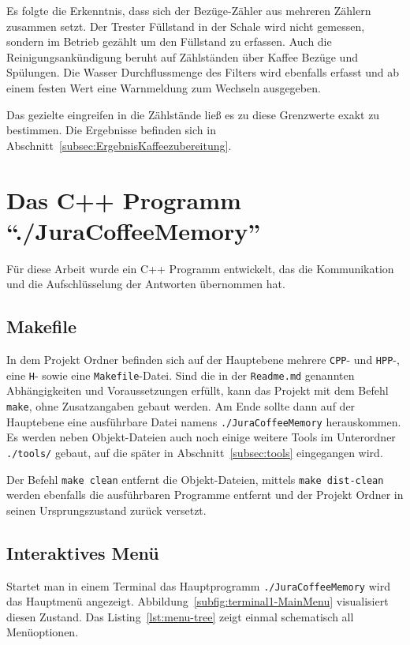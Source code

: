 Es folgte die Erkenntnis, dass sich der Bezüge-Zähler aus mehreren Zählern zusammen setzt.
Der Trester Füllstand in der Schale wird nicht gemessen, sondern im Betrieb gezählt um den Füllstand zu erfassen.
Auch die Reinigungsankündigung beruht auf Zählständen über Kaffee Bezüge und Spülungen.
Die Wasser Durchflussmenge des Filters wird ebenfalls erfasst und ab einem festen Wert eine Warnmeldung zum Wechseln ausgegeben.

Das gezielte eingreifen in die Zählstände ließ es zu diese Grenzwerte exakt zu bestimmen.
Die Ergebnisse befinden sich in Abschnitt~\ref{subsec:ErgebnisKaffeezubereitung}.

\section{Das C++ Programm "`./JuraCoffeeMemory"'}
Für diese Arbeit wurde ein C++ Programm entwickelt, das die Kommunikation und die Aufschlüsselung der Antworten übernommen hat.

\subsection{Makefile}
In dem Projekt Ordner befinden sich auf der Hauptebene mehrere \texttt{CPP}- und \texttt{HPP}-, eine \texttt{H}- sowie eine \texttt{Makefile}-Datei.
Sind die in der \texttt{Readme.md} genannten Abhängigkeiten und Voraussetzungen erfüllt, kann das Projekt mit dem Befehl \texttt{make}, ohne Zusatzangaben gebaut werden.
Am Ende sollte dann auf der Hauptebene eine ausführbare Datei namens \texttt{./JuraCoffeeMemory} herauskommen.
Es werden neben Objekt-Dateien auch noch einige weitere Tools im Unterordner \texttt{./tools/} gebaut, auf die später in Abschnitt~\ref{subsec:tools} eingegangen wird.

Der Befehl \texttt{make clean} entfernt die Objekt-Dateien, mittels \texttt{make dist-clean} werden ebenfalls die ausführbaren Programme entfernt und der Projekt Ordner in seinen Ursprungszustand zurück versetzt.

\subsection{Interaktives Menü}
Startet man in einem Terminal das Hauptprogramm \texttt{./JuraCoffeeMemory} wird das Hauptmenü angezeigt. Abbildung~\ref{subfig:terminal1-MainMenu} visualisiert diesen Zustand.
Das Listing~\ref{lst:menu-tree} zeigt einmal schematisch all Menüoptionen.

